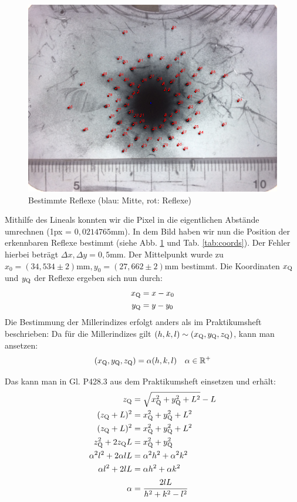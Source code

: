 \begin{figure}
\centering
\includegraphics[scale=0.6]{data/laue/draw/laue_before.png}
\caption{Bestimmte Reflexe (blau: Mitte, rot: Reflexe)}
\label{fig:laue_points}
\end{figure}

Mithilfe des Lineals konnten wir die Pixel in die eigentlichen Abstände umrechnen (1px = $0,0214765\si{\milli\meter}$). In dem Bild haben wir nun die Position der erkennbaren Reflexe bestimmt (siehe Abb. \ref{fig:laue_points} und Tab. \ref{tab:coords}). Der Fehler hierbei beträgt $\Delta x, \Delta y = 0,5 \si{\milli\meter}$. Der Mittelpunkt wurde zu $x_0 = (34,534 \pm 2)\si{\milli\meter}, y_0 = (27,662 \pm 2)\si{\milli\meter}$ bestimmt. Die Koordinaten $x_\mathrm{Q}$ und $y_\mathrm{Q}$ der Reflexe ergeben sich nun durch:
\begin{align*}
x_\mathrm{Q} &= x - x_0\\
y_\mathrm{Q} &= y - y_0
\end{align*}
Die Bestimmung der Millerindizes erfolgt anders als im Praktikumsheft beschrieben:
Da für die Millerindizes gilt $(h,k,l) \sim (x_\mathrm{Q},y_\mathrm{Q},z_\mathrm{Q})$, kann man ansetzen:
\begin{align*}
(x_\mathrm{Q},y_\mathrm{Q},z_\mathrm{Q}) &= \alpha (h,k,l) & \alpha \in \mathbb{R}^+\\
\end{align*}

Das kann man in Gl. P428.3 aus dem Praktikumsheft einsetzen und erhält:
\begin{align}
z_\mathrm{Q} &= \sqrt{x_\mathrm{Q}^2 + y_\mathrm{Q}^2 + L^2} - L\\
(z_\mathrm{Q}+L)^2 &= x_\mathrm{Q}^2 + y_\mathrm{Q}^2 + L^2\\
(z_\mathrm{Q}+L)^2 &= x_\mathrm{Q}^2 + y_\mathrm{Q}^2 + L^2\\
z_\mathrm{Q}^2+2z_\mathrm{Q}L &= x_\mathrm{Q}^2 + y_\mathrm{Q}^2\\
\alpha^2 l^2+2\alpha l L &= \alpha^2 h^2 + \alpha^2 k^2\\
\alpha l^2+2 l L &= \alpha h^2 + \alpha k^2\\
\alpha &= \cfrac{2lL}{h^2 + k^2 - l^2}
\label{eq:alpha}
\end{align}  

